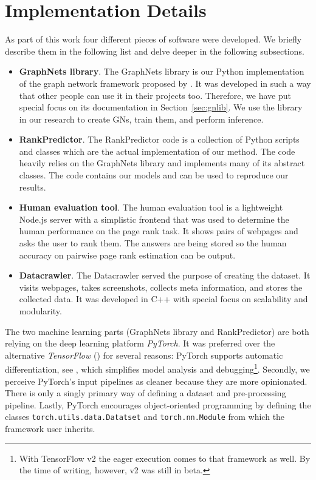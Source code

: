 \section{Implementation Details}
\label{sec:implementationdetails}

As part of this work four different pieces of software were developed. We briefly describe them in the following list and delve deeper in the following subsections.

\begin{itemize}
    \item \textbf{GraphNets library}. The GraphNets library is our Python implementation of the graph network framework proposed by \cite{deepmind:graphnets}. It was developed in such a way that other people can use it in their projects too. Therefore, we have put special focus on its documentation in Section~\ref{sec:gnlib}. We use the library in our research to create GNs, train them, and perform inference.
    \item \textbf{RankPredictor}. The RankPredictor code is a collection of Python scripts and classes which are the actual implementation of our method. The code heavily relies on the GraphNets library and implements many of its abstract classes. The code contains our models and can be used to reproduce our results.
    \item \textbf{Human evaluation tool}. The human evaluation tool is a lightweight Node.js server with a simplistic frontend that was used to determine the human performance on the page rank task. It shows pairs of webpages and asks the user to rank them. The answers are being stored so the human accuracy on pairwise page rank estimation can be output.
    \item \textbf{Datacrawler}. The Datacrawler served the purpose of creating the dataset. It visits webpages, takes screenshots, collects meta information, and stores the collected data. It was developed in C++ with special focus on scalability and modularity.
\end{itemize}

The two machine learning parts (GraphNets library and RankPredictor) are both relying on the deep learning platform \textit{PyTorch}. It was preferred over the alternative \textit{TensorFlow} (\cite{abadi2016:tensorflow}) for several reasons: PyTorch supports automatic differentiation, see \cite{paszke2017automatic:pytorch}, which simplifies model analysis and debugging\footnote{With TensorFlow v2 the eager execution comes to that framework as well. By the time of writing, however, v2 was still in beta.}. Secondly, we perceive PyTorch's input pipelines as cleaner because they are more opinionated. There is only a singly primary way of defining a dataset and pre-processing pipeline. Lastly, PyTorch encourages object-oriented programming by defining the classes \texttt{torch.utils.data.Datatset} and \texttt{torch.nn.Module} from which the framework user inherits.





